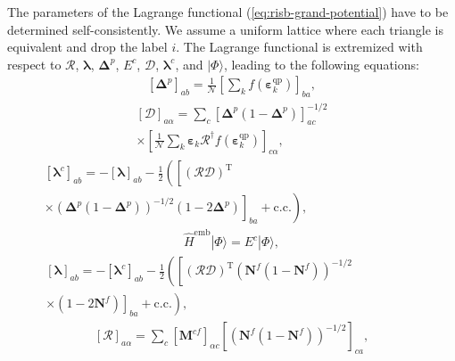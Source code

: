 \documentclass[reprint,aps,prb,amsmath,amssymb]{revtex4-2}
\begin{document}
The parameters of the Lagrange functional (\cref{eq:risb-grand-potential}) have to be determined self-consistently. We assume a uniform lattice where each triangle is equivalent and drop the label $i$. The Lagrange functional is extremized with respect to $\bm{\mathcal{R}}$, $\bm{\lambda}$, $\bm{\Delta}^p$, $E^c$, $\bm{\mathcal{D}}$, $\bm{\lambda}^c$, and $|\Phi\rangle$, leading to the following equations:
%
\begin{align} \label{eq:selfcon-1}
[\bm{\Delta}^p]_{ab} = \frac{1}{\mathcal{N}} \left[ \sum_k f(\bm{\varepsilon}_k^{\mathrm{qp}})  \right]_{ba},
\end{align}
%
\begin{multline} \label{eq:selfcon-2}
[\bm{\mathcal{D}}]_{a\alpha} = \sum_c \left[ \bm{\Delta}^p(1-\bm{\Delta}^p) \right]_{ac}^{-1/2} \\ \times \left[ \frac{1}{\mathcal{N}} \sum_k \bm{\varepsilon}_k \bm{\mathcal{R}}^{\dagger} f(\bm{\varepsilon}_k^{\mathrm{qp}}) \right]_{c\alpha},
\end{multline}
%
\begin{multline} \label{eq:selfcon-3}
[\bm{\lambda}^c]_{ab} = -[\bm{\lambda}]_{ab} -\frac{1}{2} \left( \left[ (\bm{\mathcal{R}} \bm{\mathcal{D}})^{\mathrm{T}} \phantom{(\bm{\Delta}^p(1-\bm{\Delta}^p))^{-1/2} (1-2\bm{\Delta}^p)} \right. \right. \\ 
%
\left. \left.  \times (\bm{\Delta}^p(1-\bm{\Delta}^p))^{-1/2} (1-2\bm{\Delta}^p) \right]_{ba} + \mathrm{c.c.} \right),
\end{multline}
%
\begin{align} \label{eq:selfcon-4}
	\hat{H}^{\mathrm{emb}} |\Phi\rangle = E^c |\Phi \rangle,
\end{align}
%
\begin{multline} \label{eq:selfcon-5}
[\bm{\lambda}]_{ab} = -[\bm{\lambda}^c]_{ab} - \frac{1}{2} \left( \left[ ( \bm{\mathcal{R}}  \bm{\mathcal{D}})^{\mathrm{T}} (\bm{N}^f(1-\bm{N}^f))^{-1/2} \phantom{(1-2\bm{N}^f)} \right. \right. \\
%
\left. \left. \times  (1-2\bm{N}^f) \right]_{ba} + \mathrm{c.c.} \right),
\end{multline}
%
\begin{align} \label{eq:selfcon-6}
[\bm{\mathcal{R}}]_{a\alpha} = \sum_{c} [\bm{M}^{cf}]_{\alpha c} \left[ (\bm{N}^f(1-\bm{N}^f))^{-1/2} \right]_{ca},
\end{align}
%
\end{document}

